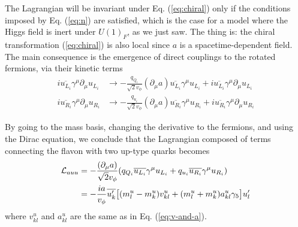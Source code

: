 \documentclass[prd,amsfonts,onecolumn,superscriptaddress,aps,nofootinbib,11pt]{revtex4-1}
\begin{document}
The Lagrangian will be invariant under Eq. (\ref{eq:chiral}) only if the conditions imposed by Eq. (\ref{eq:n}) are satisfied, which is the case for a model where the Higgs field is inert under $U(1)_F$, as we just saw. The thing is: the chiral transformation (\ref{eq:chiral}) is also local since $a$ is a spacetime-dependent field. The main consequence is the emergence of direct couplings to the rotated fermions, via their kinetic terms
\begin{equation}
    \begin{split}
        i \overline{u_{L_i}} \gamma^\mu \partial_\mu u_{L_i} &\to -\frac{q_{Q_i}}{\sqrt{2} v_\phi} (\partial_\mu a) \overline{u_{L_i}} \gamma^\mu u_{L_i} + i \overline{u_{L_i}} \gamma^\mu \partial_\mu u_{L_i} \\
        i \overline{u_{R_i}} \gamma^\mu \partial_\mu u_{R_i} &\to -\frac{q_{u_i}}{\sqrt{2} v_\phi} (\partial_\mu a) \overline{u_{R_i}} \gamma^\mu u_{R_i} + i \overline{u_{R_i}} \gamma^\mu \partial_\mu u_{R_i}
    \end{split}
\end{equation}

By going to the mass basis, changing the derivative to the fermions, and using the Dirac equation, we conclude that the Lagrangian composed of terms connecting the flavon with two up-type quarks becomes
\begin{equation}
    \begin{split}
        \mathcal{L}_{auu} &= -\frac{(\partial_\mu a)}{\sqrt{2}v_\phi} \qty(q_{Q_i} \overline{u_{L_i}} \gamma^\mu u_{L_i} + q_{u_i} \overline{u_{R_i}} \gamma^\mu u_{R_i}) \\
        &= -\frac{ia}{v_\phi}\overline{u_k^\prime} \big[ (m_l^u-m_k^u)v_{kl}^u + (m_l^u + m_k^u)a_{kl}^u \gamma_5 \big] u_l^\prime
    \end{split}
\end{equation}
where $v^u_{kl}$ and $a^u_{kl}$ are the same as in Eq. (\ref{eq:v-and-a}).



\end{document}
